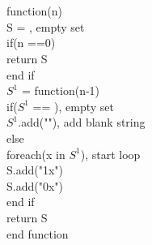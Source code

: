 \documentclass[letterpaper]{article}
\begin{document}
	\section{}
    	\subsection{}
        	function(n)\\
            	S = {}, empty set\\
                if(n ==0)\\
                return S\\
                end if\\
                $S^1$ = function(n-1)\\
                if($S^1$ == {}), empty set\\
                $S^1$.add(""), add blank string\\
                else\\
                foreach(x in $S^1$), start loop\\
                S.add("1x")\\
                S.add("0x")\\
                end if\\
                return S\\
                end function\\
\end{document}

